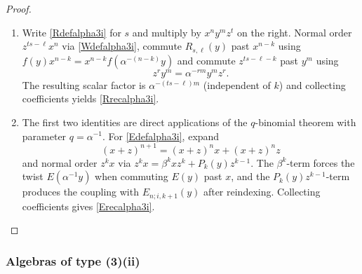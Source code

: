 \documentclass{amsart}
\theoremstyle{definition}
\theoremstyle{remark}
\numberwithin{equation}{section}
\begin{document}
\begin{proof}
\begin{enumerate}
\item [\rm (4)] Write \eqref{Rdefalpha3i} for $s$ and multiply by $x^n y^m z^t$ on the right. Normal order $z^{ts-\ell}x^n$ via \eqref{Wdefalpha3i}, commute $R_{s,\ell}(y)$ past $x^{n-k}$ using
$f(y)x^{n-k}=x^{n-k}f(\alpha^{-(n-k)}y)$ and commute $z^{ts-\ell-k}$ past $y^m$ using 
$$
z^{r}y^m = \alpha^{-rm}y^m z^{r}.
$$
The resulting scalar factor is $\alpha^{-(ts-\ell)m}$ (independent of $k$) and collecting coefficients yields \eqref{Rrecalpha3i}.

\item [\rm (5)] The first two identities are direct applications of the $q$-binomial theorem with parameter $q=\alpha^{-1}$.
For \eqref{Edefalpha3i}, expand 
$$
(x+z)^{n+1}=(x+z)^n x+(x+z)^n z
$$
and normal order $z^k x$ via $z^k x=\beta^k x z^k+P_k(y)z^{k-1}$. The $\beta^k$-term forces the twist $E(\alpha^{-1}y)$ when commuting $E(y)$ past $x$, and the $P_k(y)z^{k-1}$-term produces the coupling with $E_{n;i,k+1}(y)$ after reindexing. Collecting coefficients gives \eqref{Erecalpha3i}.
\end{enumerate}
\end{proof}


\subsubsection{Algebras of type (3)(ii)}
\end{document}

